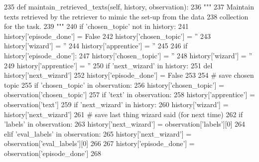 \begin{DoxyCode}
235     \textcolor{keyword}{def }maintain\_retrieved\_texts(self, history, observation):
236         \textcolor{stringliteral}{"""}
237 \textcolor{stringliteral}{        Maintain texts retrieved by the retriever to mimic the set-up from the data}
238 \textcolor{stringliteral}{        collection for the task.}
239 \textcolor{stringliteral}{        """}
240         \textcolor{keywordflow}{if} \textcolor{stringliteral}{'chosen\_topic'} \textcolor{keywordflow}{not} \textcolor{keywordflow}{in} history:
241             history[\textcolor{stringliteral}{'episode\_done'}] = \textcolor{keyword}{False}
242             history[\textcolor{stringliteral}{'chosen\_topic'}] = \textcolor{stringliteral}{''}
243             history[\textcolor{stringliteral}{'wizard'}] = \textcolor{stringliteral}{''}
244             history[\textcolor{stringliteral}{'apprentice'}] = \textcolor{stringliteral}{''}
245 
246         \textcolor{keywordflow}{if} history[\textcolor{stringliteral}{'episode\_done'}]:
247             history[\textcolor{stringliteral}{'chosen\_topic'}] = \textcolor{stringliteral}{''}
248             history[\textcolor{stringliteral}{'wizard'}] = \textcolor{stringliteral}{''}
249             history[\textcolor{stringliteral}{'apprentice'}] = \textcolor{stringliteral}{''}
250             \textcolor{keywordflow}{if} \textcolor{stringliteral}{'next\_wizard'} \textcolor{keywordflow}{in} history:
251                 del history[\textcolor{stringliteral}{'next\_wizard'}]
252             history[\textcolor{stringliteral}{'episode\_done'}] = \textcolor{keyword}{False}
253 
254         \textcolor{comment}{# save chosen topic}
255         \textcolor{keywordflow}{if} \textcolor{stringliteral}{'chosen\_topic'} \textcolor{keywordflow}{in} observation:
256             history[\textcolor{stringliteral}{'chosen\_topic'}] = observation[\textcolor{stringliteral}{'chosen\_topic'}]
257         \textcolor{keywordflow}{if} \textcolor{stringliteral}{'text'} \textcolor{keywordflow}{in} observation:
258             history[\textcolor{stringliteral}{'apprentice'}] = observation[\textcolor{stringliteral}{'text'}]
259         \textcolor{keywordflow}{if} \textcolor{stringliteral}{'next\_wizard'} \textcolor{keywordflow}{in} history:
260             history[\textcolor{stringliteral}{'wizard'}] = history[\textcolor{stringliteral}{'next\_wizard'}]
261         \textcolor{comment}{# save last thing wizard said (for next time)}
262         \textcolor{keywordflow}{if} \textcolor{stringliteral}{'labels'} \textcolor{keywordflow}{in} observation:
263             history[\textcolor{stringliteral}{'next\_wizard'}] = observation[\textcolor{stringliteral}{'labels'}][0]
264         \textcolor{keywordflow}{elif} \textcolor{stringliteral}{'eval\_labels'} \textcolor{keywordflow}{in} observation:
265             history[\textcolor{stringliteral}{'next\_wizard'}] = observation[\textcolor{stringliteral}{'eval\_labels'}][0]
266 
267         history[\textcolor{stringliteral}{'episode\_done'}] = observation[\textcolor{stringliteral}{'episode\_done'}]
268 
\end{DoxyCode}
